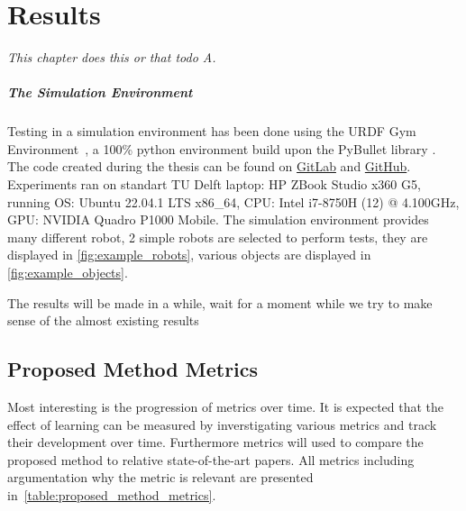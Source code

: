 \chapter{Results}%
\label{chap:results}
\textit{This chapter does this or that todo A.\bs}

\paragraph{The Simulation Environment}
Testing in a simulation environment has been done using the URDF Gym Environment~\cite{spahn_urdfenvironment_2022}, a 100\% python environment build upon the PyBullet library \cite{coumans_pybullet_2016}. The code created during the thesis can be found on \href{https://gitlab.tudelft.nl/airlab-delft/msc_projects/msc_gijs_groote}{GitLab} and \href{https://github.com/GijsGroote/semantic-thinking-robot}{GitHub}. Experiments ran on standart TU Delft laptop: HP ZBook Studio x360 G5, running OS: Ubuntu 22.04.1 LTS x86\_64, CPU: Intel i7-8750H (12) @ 4.100GHz, GPU: NVIDIA Quadro P1000 Mobile.\bs
The simulation environment provides many different robot, 2 simple robots are selected to perform tests, they are displayed in \cref{fig:example_robots}, various objects are displayed in \cref{fig:example_objects}.


The results will be made in a while, wait for a moment while we try to make sense of the almost existing results


\section{Proposed Method Metrics}%
\label{sec:proposed_method_metrics}
Most interesting is the progression of metrics over time. It is expected that the effect of learning can be measured by inverstigating various metrics and track their development over time. Furthermore metrics will used to compare the proposed method to relative state-of-the-art papers. All metrics including argumentation why the metric is relevant are presented in~\cref{table:proposed_method_metrics}.\bs

